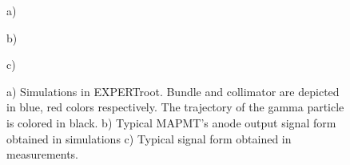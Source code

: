 \documentclass{webofc}
\newcommand{\er}{\textmd{EXPERTroot}}
\begin{document}
	\begin{figure} 
		\begin{minipage}[h]{\linewidth} 
			 a) \\ 
		\end{minipage} 
		\vfill 
		\begin{minipage}[h]{0.47\linewidth} 
			 b) \\
		\end{minipage} 
		\hfill 
		\begin{minipage}[h]{0.47\linewidth} 
			 c) \\ 
		\end{minipage} 
		\caption{a) Simulations in \er. Bundle and collimator are depicted in blue, red colors respectively. The trajectory of the gamma particle is colored in black. b) Typical MAPMT's anode output signal form obtained in simulations c) Typical signal form obtained in measurements.} 
		\label{ris:sim} 
	\end{figure}
\end{document}
